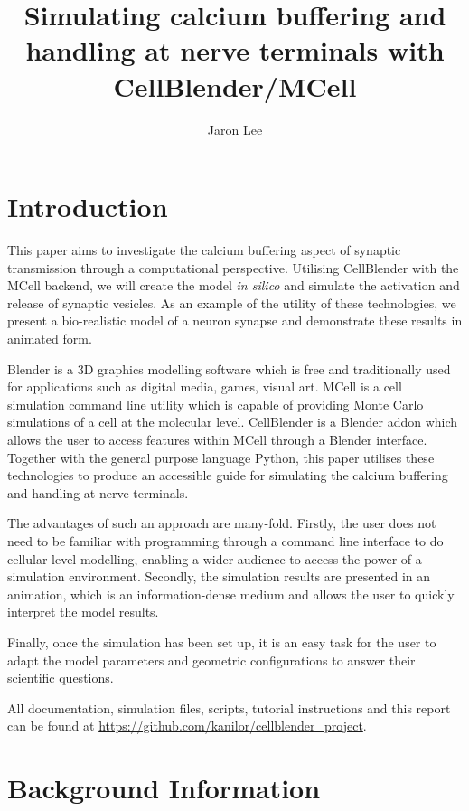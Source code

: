 \documentclass[a4paper]{article}
\title{Simulating calcium buffering and handling at nerve terminals with CellBlender/MCell}
\author{Jaron Lee}
\begin{document}
\maketitle

\section{Introduction}
This paper aims to investigate the calcium buffering aspect of synaptic transmission through a computational perspective. Utilising CellBlender with the MCell backend, we will create the model \textit{in silico} and simulate the activation and release of synaptic vesicles. As an example of the utility of these technologies, we present a bio-realistic model of a neuron synapse and demonstrate these results in animated form.

Blender is a 3D graphics modelling software which is free and traditionally used for applications such as digital media, games, visual art. MCell is a cell simulation command line utility which is capable of providing Monte Carlo simulations of a cell at the molecular level. CellBlender is a Blender addon which allows the user to access features within MCell through a Blender interface. Together with the general purpose language Python, this paper utilises these technologies to produce an accessible guide for simulating the calcium buffering and handling at nerve terminals.

The advantages of such an approach are many-fold. Firstly, the user does not need to be familiar with programming through a command line interface to do cellular level modelling, enabling a wider audience to access the power of a simulation environment. Secondly, the simulation results are presented in an animation, which is an information-dense medium and allows the user to quickly interpret the model results.

Finally, once the simulation has been set up, it is an easy task for the user to adapt the model parameters and geometric configurations to answer their scientific questions. 

All documentation, simulation files, scripts, tutorial instructions and this report can be found at \url{https://github.com/kanilor/cellblender_project}.

\section{Background Information}
\end{document}
